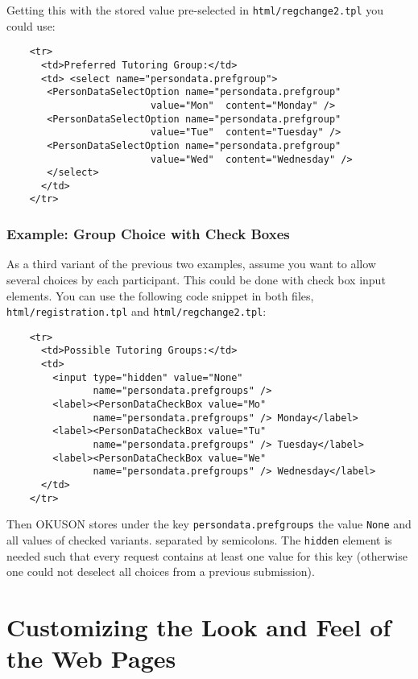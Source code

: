 \documentclass[12pt,openany,a4paper]{book}
\newcommand{\OKUSON}{\textsf{OKUSON}}
\begin{document}
Getting this with the stored value pre-selected in
\texttt{html/regchange2.tpl} you could use:

\begin{verbatim}
    <tr>
      <td>Preferred Tutoring Group:</td>
      <td> <select name="persondata.prefgroup">
       <PersonDataSelectOption name="persondata.prefgroup" 
                         value="Mon"  content="Monday" />
       <PersonDataSelectOption name="persondata.prefgroup" 
                         value="Tue"  content="Tuesday" />
       <PersonDataSelectOption name="persondata.prefgroup" 
                         value="Wed"  content="Wednesday" />
       </select>
      </td>
    </tr>
\end{verbatim}

\subsubsection*{Example: Group Choice with Check Boxes}

As a third variant of the previous two examples, assume you want to allow
several choices by each participant. This could be done with check box input
elements. You can use the following code snippet in both files,
\texttt{html/registration.tpl} and \texttt{html/regchange2.tpl}:

\begin{verbatim}
    <tr>
      <td>Possible Tutoring Groups:</td>
      <td>
        <input type="hidden" value="None" 
               name="persondata.prefgroups" />
        <label><PersonDataCheckBox value="Mo" 
               name="persondata.prefgroups" /> Monday</label>
        <label><PersonDataCheckBox value="Tu" 
               name="persondata.prefgroups" /> Tuesday</label>
        <label><PersonDataCheckBox value="We" 
               name="persondata.prefgroups" /> Wednesday</label>
      </td>
    </tr>
\end{verbatim}

Then \OKUSON{} stores under the key \texttt{persondata.prefgroups}
the value \texttt{None} and all values of checked variants.
separated by semicolons.
The \texttt{hidden} element is needed such that every request contains at 
least one value for this key (otherwise one could not deselect all choices
from a previous submission).



\section{Customizing the Look and Feel of the Web Pages}
\end{document}
